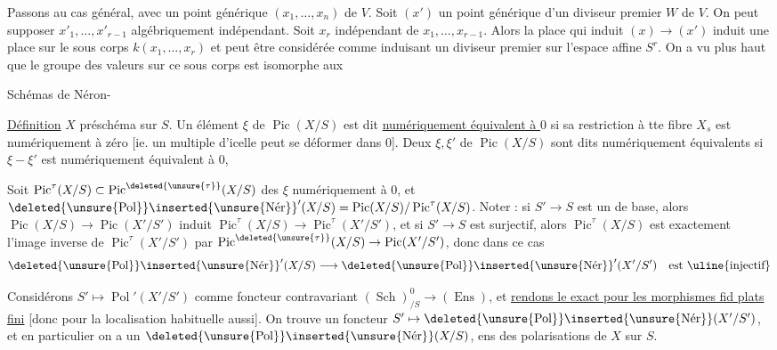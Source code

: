 Passons au cas général, avec un point générique $(x_1,\ldots,x_n)$ de $V$. Soit $(x')$ un point générique d'un diviseur premier $W$ de $V$. On peut supposer $x'_1,\ldots,x'_{r-1}$ algébriquement indépendant. Soit $x_r$ indépendant de $x_1,\ldots,x_{r-1}$. Alors la place qui induit $(x)\longrightarrow(x')$ induit une place sur le sous corps $k(x_1,\ldots,x_r)$ et peut être considérée comme induisant un diviseur premier sur l'espace affine $S^r$. On a vu plus haut que le groupe des valeurs sur ce sous corps est isomorphe aux


Schémas de Néron-

\uline{Définition} $X$ préschéma sur $S$. Un élément $\xi$ de $\operatorname{Pic}(X/S)$ est dit \uline{numériquement équivalent à $0$} si sa restriction à tte fibre $X_s$ est numériquement  à zéro [ie. un multiple d'icelle peut se déformer dans $0$]. Deux  $\xi,\xi'$ de $\operatorname{Pic}(X/S)$ sont dits numériquement équivalents si $\xi-\xi'$ est numériquement équivalent à $0$,

Soit $\operatorname{Pic}^{\tau}(X/S)\subset\operatorname{Pic}^{\deleted{\unsure{\tau}}}(X/S)$ des $\xi$ numériquement  à $0$, et $\deleted{\unsure{\operatorname{Pol}}}\inserted{\unsure{\operatorname{N\acute{e}r}}}'(X/S)=\operatorname{Pic}(X/S)/\operatorname{Pic}^{\tau}(X/S)$. Noter : si  $S'\to S$ est un  de base, alors $\operatorname{Pic}(X/S)\to\operatorname{Pic}(X'/S')$ induit $\operatorname{Pic}^{\tau}(X/S)\to\operatorname{Pic}^{\tau}(X'/S')$, et si $S'\to S$ est surjectif, alors  $\operatorname{Pic}^{\tau}(X/S)$ est exactement l'image inverse de $\operatorname{Pic}^{\tau}(X'/S')$ par $\operatorname{Pic}^{\deleted{\unsure{\tau}}}(X/S)\to\operatorname{Pic}(X'/S')$, donc dans ce cas
\[
\deleted{\unsure{\operatorname{Pol}}}\inserted{\unsure{\operatorname{N\acute{e}r}}}'(X/S)\longrightarrow\deleted{\unsure{\operatorname{Pol}}}\inserted{\unsure{\operatorname{N\acute{e}r}}}'(X'/S')\quad\text{est \uline{injectif}}
\]

Considérons $S'\mapsto\operatorname{Pol}'(X'/S')$ comme foncteur contravariant $(\operatorname{Sch})^0_{/S}\longrightarrow(\operatorname{Ens})$, et \uline{rendons le exact pour les morphismes fid plats   fini} [donc pour la localisation habituelle aussi]. On trouve un foncteur $S'\mapsto\deleted{\unsure{\operatorname{Pol}}}\inserted{\unsure{\operatorname{N\acute{e}r}}}(X'/S')$, et en particulier on a un  $\deleted{\unsure{\operatorname{Pol}}}\inserted{\unsure{\operatorname{N\acute{e}r}}}(X/S)$, ens des polarisations de $X$ sur $S$.


